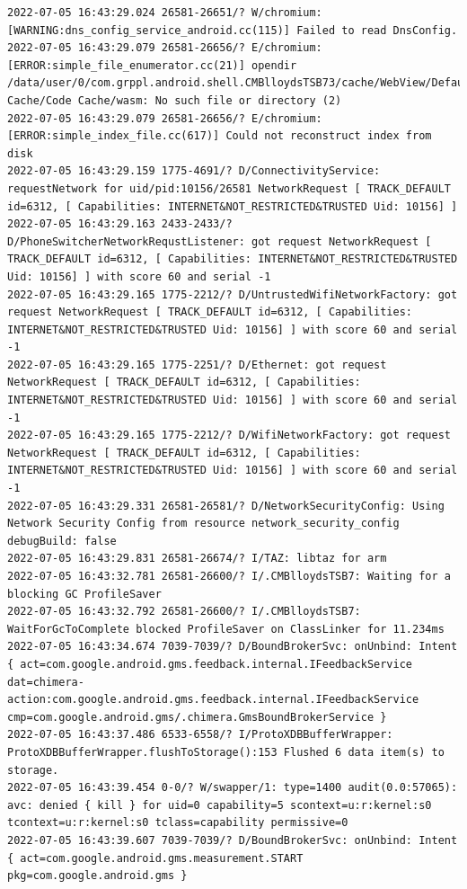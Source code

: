 \documentclass[a4paper,12pt]{book}
\begin{document}
\begin{lstlisting}
2022-07-05 16:43:29.024 26581-26651/? W/chromium: [WARNING:dns_config_service_android.cc(115)] Failed to read DnsConfig.
2022-07-05 16:43:29.079 26581-26656/? E/chromium: [ERROR:simple_file_enumerator.cc(21)] opendir /data/user/0/com.grppl.android.shell.CMBlloydsTSB73/cache/WebView/Default/HTTP Cache/Code Cache/wasm: No such file or directory (2)
2022-07-05 16:43:29.079 26581-26656/? E/chromium: [ERROR:simple_index_file.cc(617)] Could not reconstruct index from disk
2022-07-05 16:43:29.159 1775-4691/? D/ConnectivityService: requestNetwork for uid/pid:10156/26581 NetworkRequest [ TRACK_DEFAULT id=6312, [ Capabilities: INTERNET&NOT_RESTRICTED&TRUSTED Uid: 10156] ]
2022-07-05 16:43:29.163 2433-2433/? D/PhoneSwitcherNetworkRequstListener: got request NetworkRequest [ TRACK_DEFAULT id=6312, [ Capabilities: INTERNET&NOT_RESTRICTED&TRUSTED Uid: 10156] ] with score 60 and serial -1
2022-07-05 16:43:29.165 1775-2212/? D/UntrustedWifiNetworkFactory: got request NetworkRequest [ TRACK_DEFAULT id=6312, [ Capabilities: INTERNET&NOT_RESTRICTED&TRUSTED Uid: 10156] ] with score 60 and serial -1
2022-07-05 16:43:29.165 1775-2251/? D/Ethernet: got request NetworkRequest [ TRACK_DEFAULT id=6312, [ Capabilities: INTERNET&NOT_RESTRICTED&TRUSTED Uid: 10156] ] with score 60 and serial -1
2022-07-05 16:43:29.165 1775-2212/? D/WifiNetworkFactory: got request NetworkRequest [ TRACK_DEFAULT id=6312, [ Capabilities: INTERNET&NOT_RESTRICTED&TRUSTED Uid: 10156] ] with score 60 and serial -1
2022-07-05 16:43:29.331 26581-26581/? D/NetworkSecurityConfig: Using Network Security Config from resource network_security_config debugBuild: false
2022-07-05 16:43:29.831 26581-26674/? I/TAZ: libtaz for arm
2022-07-05 16:43:32.781 26581-26600/? I/.CMBlloydsTSB7: Waiting for a blocking GC ProfileSaver
2022-07-05 16:43:32.792 26581-26600/? I/.CMBlloydsTSB7: WaitForGcToComplete blocked ProfileSaver on ClassLinker for 11.234ms
2022-07-05 16:43:34.674 7039-7039/? D/BoundBrokerSvc: onUnbind: Intent { act=com.google.android.gms.feedback.internal.IFeedbackService dat=chimera-action:com.google.android.gms.feedback.internal.IFeedbackService cmp=com.google.android.gms/.chimera.GmsBoundBrokerService }
2022-07-05 16:43:37.486 6533-6558/? I/ProtoXDBBufferWrapper: ProtoXDBBufferWrapper.flushToStorage():153 Flushed 6 data item(s) to storage.
2022-07-05 16:43:39.454 0-0/? W/swapper/1: type=1400 audit(0.0:57065): avc: denied { kill } for uid=0 capability=5 scontext=u:r:kernel:s0 tcontext=u:r:kernel:s0 tclass=capability permissive=0
2022-07-05 16:43:39.607 7039-7039/? D/BoundBrokerSvc: onUnbind: Intent { act=com.google.android.gms.measurement.START pkg=com.google.android.gms }

\end{lstlisting}
\end{document}
